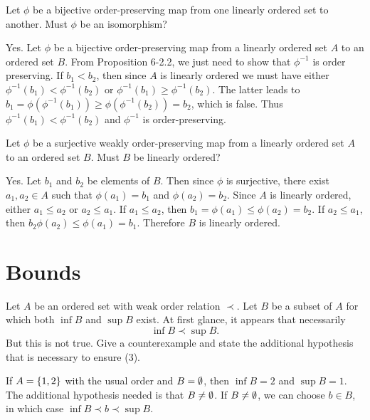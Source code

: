 \begin{exercise}
Let $\phi$ be a bijective order-preserving map from one linearly ordered set to another.
Must $\phi$ be an isomorphism?
\end{exercise}

\begin{solution}
Yes. Let $\phi$ be a bijective order-preserving map from a linearly ordered set $A$ to
an ordered set $B$.
From Proposition 6-2.2, we just need to show that $\phi^{-1}$ is order preserving.
If $b_1 < b_2$, then since $A$ is linearly ordered we must have either $\phi^{-1}(b_1)<\phi^{-1}(b_2)$
or $\phi^{-1}(b_1)\geq \phi^{-1}(b_2)$. The latter leads to $b_1=\phi(\phi^{-1}(b_1))\geq \phi(\phi^{-1}(b_2))=b_2$,
which is false. Thus $\phi^{-1}(b_1)<\phi^{-1}(b_2)$ and $\phi^{-1}$ is order-preserving.
\end{solution}

\begin{exercise}
Let $\phi$ be a surjective weakly order-preserving map from a linearly ordered set $A$
to an ordered set $B$. Must $B$ be linearly ordered?
\end{exercise}

\begin{solution}
Yes. Let $b_1$ and $b_2$ be elements of $B$. Then since $\phi$ is surjective, there exist
$a_1,a_2\in A$ such that $\phi(a_1)=b_1$ and $\phi(a_2)=b_2$.
Since $A$ is linearly ordered, either $a_1\leq a_2$ or $a_2\leq a_1$.
If $a_1\leq a_2$, then $b_1=\phi(a_1)\leq \phi(a_2)=b_2$.
If $a_2\leq a_1$, then $b_2\phi(a_2)\leq \phi(a_1)=b_1$.
Therefore $B$ is linearly ordered.
\end{solution}

\section{Bounds}
\begin{exercise}
Let $A$ be an ordered set with weak order relation $\prec$. Let $B$ be a subset of $A$ for
which both $\inf B$ and $\sup B$ exist. At first glance, it appears that necessarily
\[\inf B \prec \sup B.\tag{(3)}\]
But this is not true. Give a counterexample and state the additional hypothesis that
is necessary to ensure (3).
\end{exercise}

\begin{solution}
If $A=\left\{1,2\right\}$ with the usual order and $B=\emptyset$, then $\inf B=2$ and $\sup B=1$.
The additional hypothesis needed is that $B\neq\emptyset$.
If $B\neq\emptyset$, we can choose $b\in B$, in which case $\inf B\prec b\prec \sup B$.
\end{solution}

